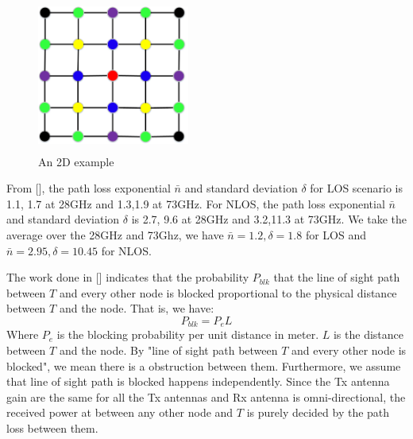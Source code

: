 \documentclass[conference]{IEEEtran}
\begin{document}
\begin{figure}
	\centerline{\includegraphics[width=5cm,height=5cm]{grid}}
	\caption[U-example]{An 2D example}
\end{figure}
From [], the path loss exponential $\bar{n}$ and standard deviation $\delta$ for LOS scenario is 1.1, 1.7 at 28GHz and 1.3,1.9 at 73GHz. For NLOS, the path loss exponential $\bar{n}$ and standard deviation $\delta$ is 2.7, 9.6 at 28GHz and 3.2,11.3 at 73GHz. We take the average over the 28GHz and 73Ghz, we have $\bar{n} = 1.2, \delta=1.8$ for LOS and  $\bar{n} = 2.95, \delta=10.45$ for NLOS.

The work done in [] indicates that the probability $P_{blk}$ that the line of sight path between $T$ and every other node is blocked proportional to the physical distance between $T$ and the node. That is, we have:
\begin{equation}
    P_{blk} = P_{e}L 
\end{equation}
Where $P_{e}$ is the blocking probability per unit distance in meter. $L$ is the distance between $T$ and the node. By "line of sight path between $T$ and every other node is blocked", we mean there is a obstruction between them. Furthermore, we assume that line of sight path is blocked happens independently. Since the Tx antenna gain are the same for all the Tx antennas and Rx antenna is omni-directional, the received power at between any other node and $T$ is purely decided by the path loss between them.
\end{document}
